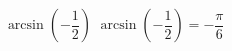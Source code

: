  {$\arcsin \left( -\dfrac{1}{2} \right)$ }
{ $\arcsin \left( -\dfrac{1}{2} \right) = -\dfrac{\pi}{6}$}

